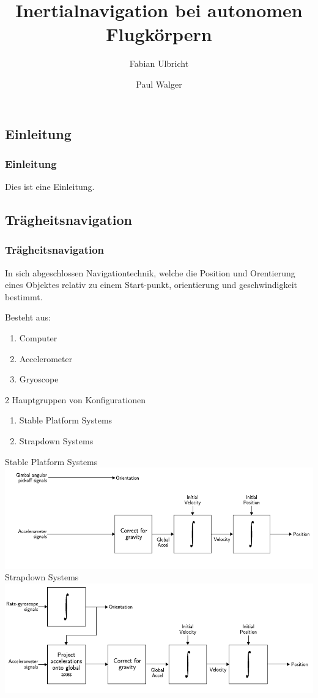 \documentclass[10pt,a4paper,oneside]{beamer}
\title{Inertialnavigation bei autonomen Flugkörpern}
\author{
	Fabian Ulbricht \and
	Paul Walger 
}
\begin{document}
\frame{
	\titlepage
}


\begin{frame}
  \section{Einleitung}
  \frametitle{Einleitung}
  
  Dies ist eine Einleitung.
\end{frame}


\begin{frame}
	\section{Trägheitsnavigation}
	\frametitle{Trägheitsnavigation}
	In sich abgeschlossen Navigationtechnik, welche die Position und Orentierung eines Objektes relativ zu einem Start-punkt, orientierung und geschwindigkeit bestimmt.
	
	Besteht aus:
	\begin{enumerate}
		\item Computer
		\item Accelerometer
		\item Gryoscope
	\end{enumerate}
	
	2 Hauptgruppen von Konfigurationen \cite{Wood07}
	\begin{enumerate}
		\item Stable Platform Systems
		\item Strapdown Systems
	\end{enumerate}
\end{frame}
\begin{frame}
	Stable Platform Systems
	\resizebox{\textwidth}{0.4\textheight} {
	\includegraphics[scale=1]{images/stable_platform.png} 
	}
	\bigskip
	Strapdown Systems
	\resizebox{\textwidth}{0.4\textheight} {
		\includegraphics[scale=1]{images/strapdown.png} 
	}

\end{frame}
\end{document}
